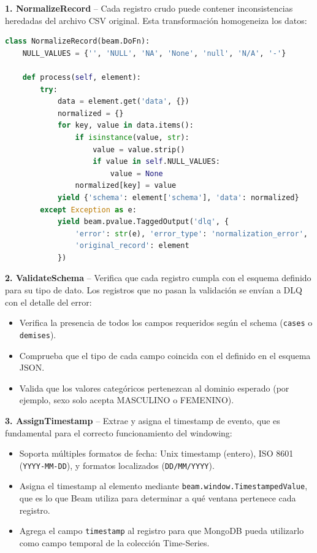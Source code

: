 \documentclass[12pt,a4paper]{article}
\begin{document}
\textbf{1. NormalizeRecord} -- Cada registro crudo puede contener inconsistencias heredadas del archivo CSV original. Esta transformación homogeneiza los datos:

\begin{lstlisting}[language=Python, caption=Lógica de NormalizeRecord]
class NormalizeRecord(beam.DoFn):
    NULL_VALUES = {'', 'NULL', 'NA', 'None', 'null', 'N/A', '-'}

    def process(self, element):
        try:
            data = element.get('data', {})
            normalized = {}
            for key, value in data.items():
                if isinstance(value, str):
                    value = value.strip()
                    if value in self.NULL_VALUES:
                        value = None
                normalized[key] = value
            yield {'schema': element['schema'], 'data': normalized}
        except Exception as e:
            yield beam.pvalue.TaggedOutput('dlq', {
                'error': str(e), 'error_type': 'normalization_error',
                'original_record': element
            })
\end{lstlisting}

\textbf{2. ValidateSchema} -- Verifica que cada registro cumpla con el esquema definido para su tipo de dato. Los registros que no pasan la validación se envían a DLQ con el detalle del error:

\begin{itemize}
    \item Verifica la presencia de todos los campos requeridos según el schema (\texttt{cases} o \texttt{demises}).
    \item Comprueba que el tipo de cada campo coincida con el definido en el esquema JSON.
    \item Valida que los valores categóricos pertenezcan al dominio esperado (por ejemplo, sexo solo acepta MASCULINO o FEMENINO).
\end{itemize}

\textbf{3. AssignTimestamp} -- Extrae y asigna el timestamp de evento, que es fundamental para el correcto funcionamiento del windowing:

\begin{itemize}
    \item Soporta múltiples formatos de fecha: Unix timestamp (entero), ISO 8601 (\texttt{YYYY-MM-DD}), y formatos localizados (\texttt{DD/MM/YYYY}).
    \item Asigna el timestamp al elemento mediante \texttt{beam.window.TimestampedValue}, que es lo que Beam utiliza para determinar a qué ventana pertenece cada registro.
    \item Agrega el campo \texttt{timestamp} al registro para que MongoDB pueda utilizarlo como campo temporal de la colección Time-Series.
\end{itemize}
\end{document}
